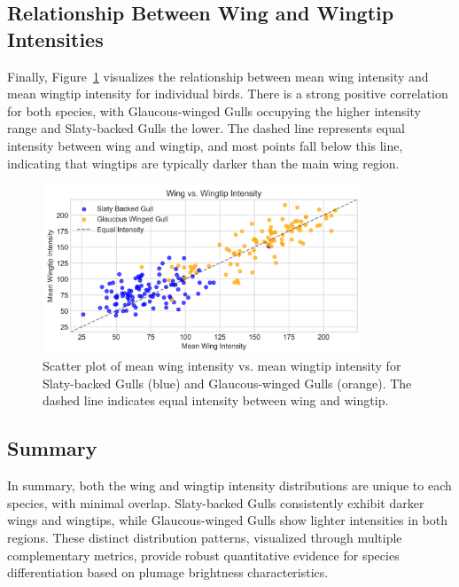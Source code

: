 \documentclass[a4paper,12pt]{report}
\begin{document}
\subsection{Relationship Between Wing and Wingtip Intensities}

Finally, Figure~\ref{fig:wing_vs_wingtip_intensity} visualizes the relationship between mean wing intensity and mean wingtip intensity for individual birds. There is a strong positive correlation for both species, with Glaucous-winged Gulls occupying the higher intensity range and Slaty-backed Gulls the lower. The dashed line represents equal intensity between wing and wingtip, and most points fall below this line, indicating that wingtips are typically darker than the main wing region.

\begin{figure}[h]
    \centering
    \includegraphics[width=0.85\textwidth]{images/REPORT_IMAGES_INTENSITY/I2/clusterwingwingtip.png}
    \caption{Scatter plot of mean wing intensity vs. mean wingtip intensity for Slaty-backed Gulls (blue) and Glaucous-winged Gulls (orange). The dashed line indicates equal intensity between wing and wingtip.}
    \label{fig:wing_vs_wingtip_intensity}
\end{figure}

\subsection{Summary}

In summary, both the wing and wingtip intensity distributions are unique to each species, with minimal overlap. Slaty-backed Gulls consistently exhibit darker wings and wingtips, while Glaucous-winged Gulls show lighter intensities in both regions. These distinct distribution patterns, visualized through multiple complementary metrics, provide robust quantitative evidence for species differentiation based on plumage brightness characteristics.
\end{document}
